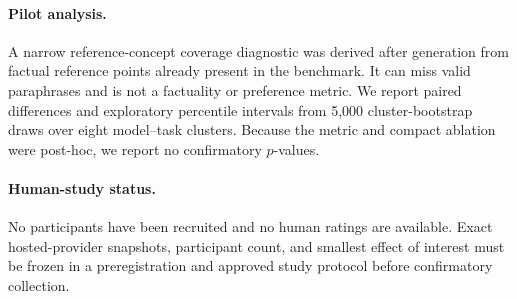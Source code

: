 \paragraph{Pilot analysis.} A narrow reference-concept coverage diagnostic was
derived after generation from factual reference points already present in the
benchmark. It can miss valid paraphrases and is not a factuality or preference
metric. We report paired differences and exploratory percentile intervals from
5,000 cluster-bootstrap draws over eight model--task clusters. Because the metric
and compact ablation were post-hoc, we report no confirmatory $p$-values.

\paragraph{Human-study status.} No participants have been recruited and no human
ratings are available. Exact hosted-provider snapshots, participant count, and
smallest effect of interest must be frozen in a preregistration and approved study
protocol before confirmatory collection.

